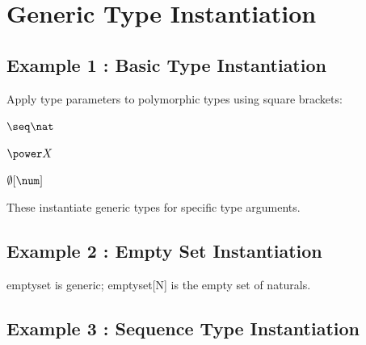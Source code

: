 \documentclass[a4paper,10pt,fleqn]{article}
\begin{document}
\section*{Generic Type Instantiation}

\subsection*{Example 1 : Basic Type Instantiation}

\noindent Apply type parameters to polymorphic types using square brackets:

\bigskip

\noindent
$\seq \nat$


\noindent
$\power X$


\noindent
$\emptyset[\num]$


\noindent These instantiate generic types for specific type arguments.

\bigskip

\subsection*{Example 2 : Empty Set Instantiation}


\noindent emptyset is generic; emptyset[N] is the empty set of naturals.

\bigskip

\subsection*{Example 3 : Sequence Type Instantiation}

\end{document}
